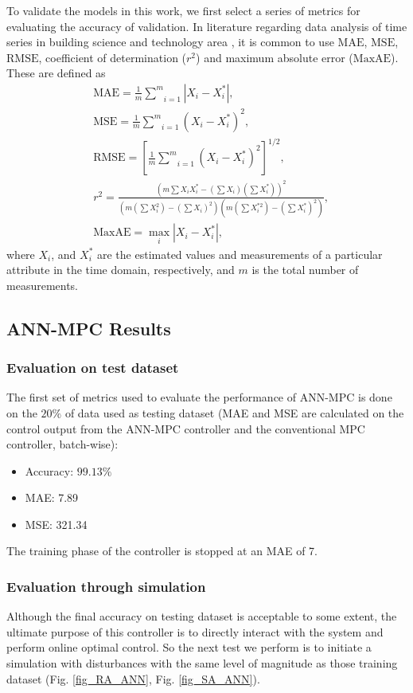 \documentclass[conference]{IEEEtran}
\begin{document}
To validate the models in this work, we first select a series of metrics for evaluating the accuracy of validation. In literature regarding data analysis of time series in building science and technology area \cite{FraustoPietersDeltour03,Anderson94,Brillinger01,NorgaardRavnPoulsenHansen00,Norlen90}, it is common to use $\mathrm{MAE}$, $\mathrm{MSE}$, $\mathrm{RMSE}$, coefficient of determination ($r^{2}$) and maximum absolute error ($\mathrm{MaxAE}$). 
These are defined as
\begin{align}
&\mathrm{MAE}=\frac{1}{m}\underset{i=1}{\overset{m}{\sum}}\left\vert X_{i}%
-X_{i}^{\ast}\right\vert ,\\
&\mathrm{MSE}=\frac{1}{m}\underset{i=1}{\overset{m}{\sum}}(X_{i}-X_{i}^{\ast}%
)^{2},\\
&\mathrm{RMSE}=[\frac{1}{m}\underset{i=1}{\overset{m}{\sum}}(X_{i}-X_{i}^{\ast
})^{2}]^{1/2},\\
&r^{2}=\frac{(m\sum X_{i}X_{i}^{\ast}-(\sum X_{i})(\sum X_{i}^{\ast}%
))^{2}}{(m(\sum X_{i}^{2})-(\sum X_{i})^{2})(m(\sum X_{i}^{\ast2})-(\sum
X_{i}^{\ast})^{2})},\\
&\mathrm{MaxAE}=\underset{i}{\max}\left\vert X_{i}-X_{i}^{\ast}\right\vert ,
\end{align}
where $X_{i}$, and $X_{i}^{\ast}$ are the estimated values and measurements of
a particular attribute in the time domain, respectively, and $m$ is the total
number of measurements.

\subsection{ANN-MPC Results}
\subsubsection{Evaluation on test dataset}
The first set of metrics used to evaluate the performance of ANN-MPC is done on the $20\%$ of data used as testing dataset (MAE and MSE are calculated on the control output from the ANN-MPC controller and the conventional MPC controller, batch-wise):
\begin{itemize}
\item Accuracy: $99.13\%$ 
\item MAE: 7.89
\item MSE: 321.34
\end{itemize}

The training phase of the controller is stopped at an MAE of 7.

\subsubsection{Evaluation through simulation}
Although the final accuracy on testing dataset is acceptable to some extent, the ultimate purpose of this controller is to directly interact with the system and perform online optimal control. So the next test we perform is to initiate a simulation with disturbances with the same level of magnitude as those training dataset (Fig. \ref{fig_RA_ANN}, Fig. \ref{fig_SA_ANN}).
\end{document}
